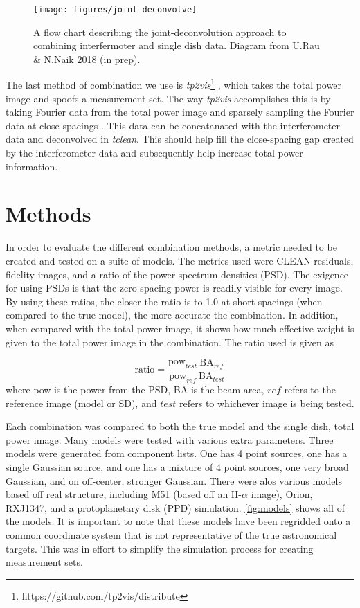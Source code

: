 \documentclass[manuscript,linenumbers]{aastex62}
\begin{document}
\begin{figure}[t]
    \texttt{[image: figures/joint-deconvolve]}
    \caption{A flow chart describing the joint-deconvolution approach to combining interfermoter and single dish data. Diagram from U.Rau \& N.Naik 2018 (in prep).}
    \label{fig:jd-flow}
\end{figure}

The last method of combination we use is \textit{tp2vis}\footnote{https://github.com/tp2vis/distribute} , which takes the total power image and spoofs a measurement set. The way \textit{tp2vis} accomplishes this is by taking Fourier data from the total power image and sparsely sampling the Fourier data at close spacings \citep[see][]{2011ApJS..193...19K}. This data can be concatanated with the interferometer data and deconvolved in \textit{tclean}. This should help fill the close-spacing gap created by the interferometer data and subsequently help increase total power information.

\section{Methods}

In order to evaluate the different combination methods, a metric needed to be created and tested on a suite of models. The metrics used were CLEAN residuals, fidelity images, and a ratio of the power spectrum densities (PSD). The exigence for using PSDs is that the zero-spacing power is readily visible for every image. By using these ratios, the closer the ratio is to 1.0 at short spacings (when compared to the true model), the more accurate the combination. In addition, when compared with the total power image, it shows how much effective weight is given to the total power image in the combination. The ratio used is given as

\begin{equation}
    \text{ratio} = \frac{\text{pow}_{test}}{\text{pow}_{ref}} \frac{\text{BA}_{ref}}{\text{BA}_{test}}
    \label{eqn:ratio}
\end{equation} 
where pow is the power from the PSD, BA is the beam area, $ref$ refers to the reference image (model or SD), and $test$ refers to whichever image is being tested.

Each combination was compared to both the true model and the single dish, total power image. Many models were tested with various extra parameters. Three models were generated from component lists. One has 4 point sources, one has a single Gaussian source, and one has a mixture of 4 point sources, one very broad Gaussian, and on off-center, stronger Gaussian. There were alos various models based off real structure, including M51 (based off an H-$\alpha$ image), Orion, RXJ1347, and a protoplanetary disk (PPD) simulation. \autoref{fig:models} shows all of the models. It is important to note that these models have been regridded onto a common coordinate system that is not representative of the true astronomical targets. This was in effort to simplify the simulation process for creating measurement sets. 
\end{document}
